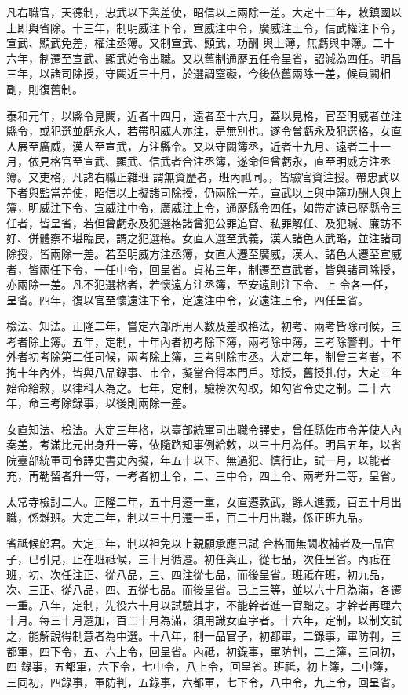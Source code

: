 \begin{pinyinscope}
 凡右職官，天德制，忠武以下與差使，昭信以上兩除一差。大定十二年，敕鎮國以上即與省除。十三年，制明威注下令，宣威注中令，廣威注上令，信武權注下令，宣武、顯武免差，權注丞簿。又制宣武、顯武，功酬
 與上簿，無虧與中簿。二十六年，制遷至宣武、顯武始令出職。又以舊制通歷五任令呈省，詔減為四任。明昌三年，以諸司除授，守闕近三十月，於選調窒礙，今後依舊兩除一差，候員闕相副，則復舊制。



 泰和元年，以縣令見闕，近者十四月，遠者至十六月，蓋以見格，官至明威者並注縣令，或犯選並虧永人，若帶明威人亦注，是無別也。遂令曾虧永及犯選格，女直人展至廣威，漢人至宣武，方注縣令。又以守闕簿丞，近者十九月、遠者二十一月，依見格官至宣武、顯武、信武者合注丞簿，遂命但曾虧永，直至明威方注丞簿。又吏格，凡諸右職正雜班
 謂無資歷者，班內祗同。，皆驗官資注授。帶忠武以下者與監當差使，昭信以上擬諸司除授，仍兩除一差。宣武以上與中簿功酬人與上簿，明威注下令，宣威注中令，廣威注上令，通歷縣令四任，如帶定遠已歷縣令三任者，皆呈省，若但曾虧永及犯選格諸曾犯公罪追官、私罪解任、及犯贓、廉訪不好、併體察不堪臨民，謂之犯選格。女直人選至武義，漢人諸色人武略，並注諸司除授，皆兩除一差。若至明威方注丞簿，女直人遷至廣威，漢人、諸色人遷至宣威者，皆兩任下令，一任中令，回呈省。貞祐三年，制遷至宣武者，皆與諸司除授，亦兩除一差。凡不犯選格者，若懷遠方注丞簿，至安遠則注下令、上
 令各一任，呈省。四年，復以官至懷遠注下令，定遠注中令，安遠注上令，四任呈省。



 檢法、知法。正隆二年，嘗定六部所用人數及差取格法，初考、兩考皆除司候，三考者除上簿。五年，定制，十年內者初考除下簿，兩考除中簿，三考除警判。十年外者初考除第二任司候，兩考除上簿，三考則除市丞。大定二年，制曾三考者，不拘十年內外，皆與八品錄事、市令，擬當合得本門戶。除授，舊授扎付，大定三年始命給敕，以律科人為之。七年，定制，驗榜次勾取，如勾省令史之制。二十六年，命三考除錄事，以後則兩除一差。



 女直知法、檢法。大定三年格，以臺部統軍司出職令譯史，曾任縣佐市令差使人內奏差，考滿比元出身升一等，依隨路知事例給敕，以三十月為任。明昌五年，以省院臺部統軍司令譯史書史內擬，年五十以下、無過犯、慎行止，試一月，以能者充，再勒留者升一等，一考者初上令，二、三中令，四上令、兩考升二等，呈省。



 太常寺檢討二人。正隆二年，五十月遷一重，女直遷敦武，餘人進義，百五十月出職，係雜班。大定二年，制以三十月遷一重，百二十月出職，係正班九品。



 省祗候郎君。大定三年，制以袒免以上親願承應已試
 合格而無闕收補者及一品官子，已引見，止在班祗候，三十月循遷。初任與正，從七品，次任呈省。內祗在班，初、次任注正、從八品，三、四注從七品，而後呈省。班祗在班，初九品，次、三正、從八品，四、五從七品。而後呈省。已上三等，並以六十月為滿，各遷一重。八年，定制，先役六十月以試驗其才，不能幹者進一官黜之。才幹者再理六十月。每三十月遷加，百二十月為滿，須用識女直字者。十六年，定制，以制文試之，能解說得制意者為中選。十八年，制一品官子，初都軍，二錄事，軍防判，三都軍，四下令，五、六上令，回呈省。內祗，初錄事，軍防判，二上簿，三同初，四
 錄事，五都軍，六下令，七中令，八上令，回呈省。班祗，初上簿，二中簿，三同初，四錄事，軍防判，五錄事，六都軍，七下令，八中令，九上令，回呈省。




\end{pinyinscope}
